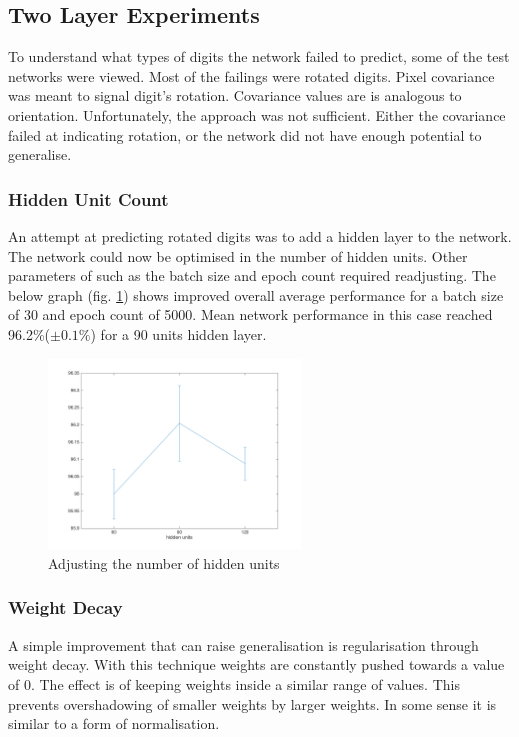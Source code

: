 \documentclass[11]{article}
\begin{document}
\subsection{Two Layer Experiments}

To understand what types of digits the network failed to predict, some of the test networks were viewed.  Most of the failings were rotated digits. Pixel covariance was meant to signal digit's rotation.  Covariance values are is analogous to orientation. Unfortunately, the approach was not sufficient. Either the covariance failed at indicating rotation, or the network did not have enough potential to generalise. 

\subsubsection{Hidden Unit Count}

An attempt at predicting rotated digits was to add a hidden layer to the network. The network could now be optimised in the number of hidden units. Other parameters of such as the batch size and epoch count required readjusting. The below graph (fig. \ref{fig:hiddenunits}) shows improved overall average performance for a batch size of 30 and epoch count of 5000.  Mean network performance in this case reached 96.2\%($\pm 0.1\%$) for a 90 units hidden layer. 
\begin{figure}[h]
\centering
\includegraphics[width=0.6\textwidth]{hiddenunits.png}
\caption{Adjusting the number of hidden units}
\label{fig:hiddenunits}
\end{figure}

\subsubsection{Weight Decay}
A simple improvement that can raise generalisation is regularisation through weight decay. With this technique weights are constantly pushed towards a value of 0. The effect is of keeping weights inside a similar range of values. This prevents overshadowing of smaller weights by larger weights. In some sense it is similar to a form of normalisation.
\end{document}
